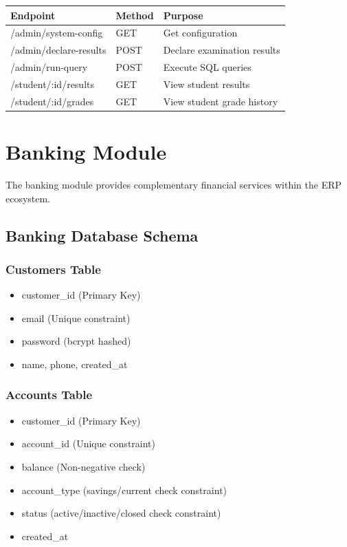 \documentclass[12pt]{article}
\begin{document}
\begin{table}[H]
\centering
\small
\begin{tabular}{|p{4cm}|p{2cm}|p{5cm}|}
\hline
\textbf{Endpoint} & \textbf{Method} & \textbf{Purpose} \\
\hline
/admin/system-config & GET & Get configuration \\
/admin/declare-results & POST & Declare examination results \\
/admin/run-query & POST & Execute SQL queries \\
/student/:id/results & GET & View student results \\
/student/:id/grades & GET & View student grade history \\
\hline
\end{tabular}
\end{table}

\newpage

\section{Banking Module}

The banking module provides complementary financial services within the ERP ecosystem.

\subsection{Banking Database Schema}

\subsubsection{Customers Table}
\begin{itemize}
    \item customer\_id (Primary Key)
    \item email (Unique constraint)
    \item password (bcrypt hashed)
    \item name, phone, created\_at
\end{itemize}

\subsubsection{Accounts Table}
\begin{itemize}
    \item customer\_id (Primary Key)
    \item account\_id (Unique constraint)
    \item balance (Non-negative check)
    \item account\_type (savings/current check constraint)
    \item status (active/inactive/closed check constraint)
    \item created\_at
\end{itemize}
\end{document}
